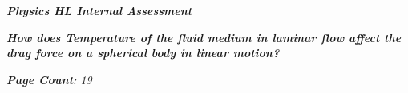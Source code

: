 

\begin{titlepage}
    \begin{center}
        \vspace*{1cm}
            
        \date{}
            
        \huge
            
        \textit{\textbf{Physics HL Internal Assessment}}
            
        \vspace{0.25cm}
            
            
        \vspace{2.5cm}
            
            
            
        \vspace{2.5cm}
            
        \LARGE
            
        \textit{\textbf{How does Temperature of the fluid medium in laminar flow affect the drag force on a spherical body in linear motion? }}


		\vspace{1.5cm}
            
        \vspace{2.5cm}
            
        \Large
            
        \vspace{0.25cm}
        

		\vspace{1cm}            
            
		\Large		
		        
		\vspace{0.25cm} 
		


		\textit{\textbf{Page Count}: 19}
		   

\end{center}
\end{titlepage}
